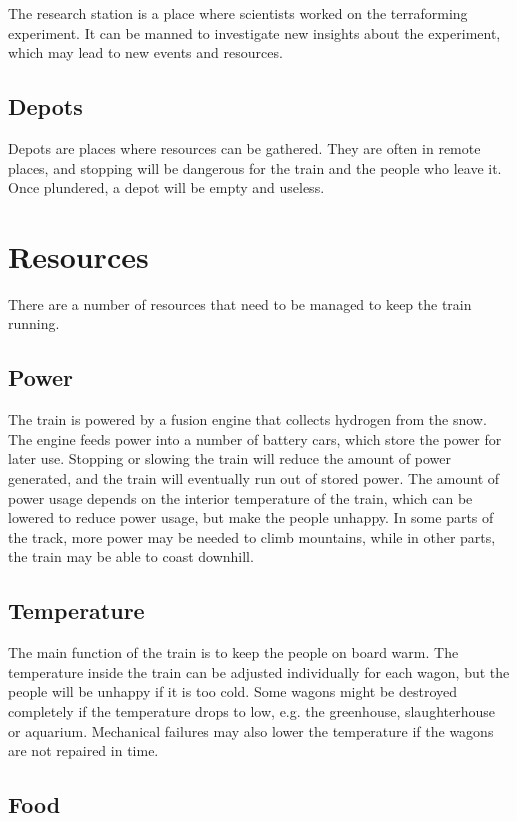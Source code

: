 The research station is a place where scientists worked on the terraforming experiment.
It can be manned to investigate new insights about the experiment, which may lead to new events and resources.

\subsection{Depots}

Depots are places where resources can be gathered.
They are often in remote places, and stopping will be dangerous for the train and the people who leave it.
Once plundered, a depot will be empty and useless.

\section{Resources}

There are a number of resources that need to be managed to keep the train running.

\subsection{Power}

The train is powered by a fusion engine that collects hydrogen from the snow.
The engine feeds power into a number of battery cars, which store the power for later use.
Stopping or slowing the train will reduce the amount of power generated, and the train will eventually run out of stored power.
The amount of power usage depends on the interior temperature of the train, which can be lowered to reduce power usage, but make the people unhappy.
In some parts of the track, more power may be needed to climb mountains, while in other parts, the train may be able to coast downhill.

\subsection{Temperature}

The main function of the train is to keep the people on board warm.
The temperature inside the train can be adjusted individually for each wagon, but the people will be unhappy if it is too cold.
Some wagons might be destroyed completely if the temperature drops to low, e.g. the greenhouse, slaughterhouse or aquarium.
Mechanical failures may also lower the temperature if the wagons are not repaired in time.

\subsection{Food}

